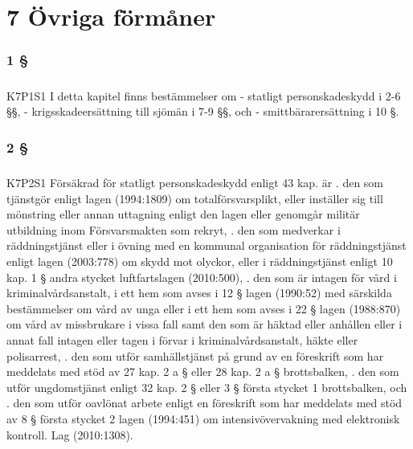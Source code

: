 \documentclass[a4paper,notitlepage,openany,10pt]{book}
\begin{document}
\chapter*{7 Övriga förmåner}
\subsection*{1 §}
\paragraph*{}
{\tiny K7P1S1}
I detta kapitel finns bestämmelser om
\newline - statligt personskadeskydd i 2-6 §§,
\newline - krigsskadeersättning till sjömän i 7-9 §§, och
\newline - smittbärarersättning i 10 §.
\subsection*{2 §}
\paragraph*{}
{\tiny K7P2S1}
Försäkrad för statligt personskadeskydd enligt 43 kap. är
. den som tjänstgör enligt lagen (1994:1809) om totalförsvarsplikt, eller inställer sig till mönstring eller annan uttagning enligt den lagen eller genomgår militär utbildning inom Försvarsmakten som rekryt,
. den som medverkar i räddningstjänst eller i övning med en kommunal organisation för räddningstjänst enligt lagen (2003:778) om skydd mot olyckor, eller i räddningstjänst enligt 10 kap. 1 § andra stycket luftfartslagen (2010:500),
. den som är intagen för vård i kriminalvårdsanstalt, i ett hem som avses i 12 § lagen (1990:52) med särskilda bestämmelser om vård av unga eller i ett hem som avses i 22 § lagen (1988:870) om vård av missbrukare i vissa fall samt den som är häktad eller anhållen eller i annat fall intagen eller tagen i förvar i kriminalvårdsanstalt, häkte eller polisarrest,
. den som utför samhällstjänst på grund av en föreskrift som har meddelats med stöd av 27 kap. 2 a § eller 28 kap. 2 a § brottsbalken,
. den som utför ungdomstjänst enligt 32 kap. 2 § eller 3 § första stycket 1 brottsbalken, och
. den som utför oavlönat arbete enligt en föreskrift som har meddelats med stöd av 8 § första stycket 2 lagen (1994:451) om intensivövervakning med elektronisk kontroll.
Lag (2010:1308).
\end{document}
